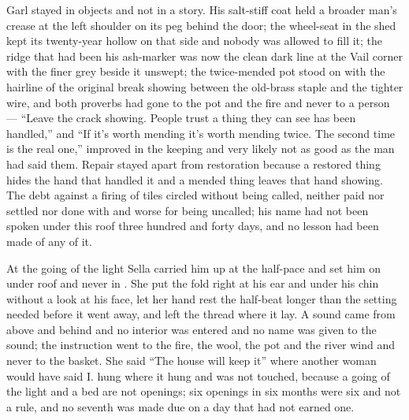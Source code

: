 Garl stayed in objects and not in a story. His salt-stiff coat held a broader man's crease at the left shoulder on its peg behind the door; the wheel-seat in the shed kept its twenty-year hollow on that side and nobody was allowed to fill it; the ridge that had been his ash-marker was now the clean dark line at the Vail corner with the finer grey beside it unswept; the twice-mended pot stood on  with the hairline of the original break showing between the old-brass staple and the tighter wire, and both proverbs had gone to the pot and the fire and never to a person --- “Leave the crack showing. People trust a thing they can see has been handled,” and “If it's worth mending it's worth mending twice. The second time is the real one,” improved in the keeping and very likely not as good as the man had said them. Repair stayed apart from restoration because a restored thing hides the hand that handled it and a mended thing leaves that hand showing. The debt against a firing of tiles circled without being called, neither paid nor settled nor done with and worse for being uncalled; his name had not been spoken under this roof three hundred and forty days, and no lesson had been made of any of it.

At the going of the light Sella carried him up at the half-pace and set him on  under  roof and never in . She put the fold right at his ear and under his chin without a look at his face, let her hand rest the half-beat longer than the setting needed before it went away, and left the thread where it lay. A sound came from above and behind and no interior was entered and no name was given to the sound; the instruction went to the fire, the wool, the pot and the river wind and never to the basket. She said “The house will keep it” where another woman would have said I.  hung where it hung and was not touched, because a going of the light and a bed are not openings; six openings in six months were six and not a rule, and no seventh was made due on a day that had not earned one.

